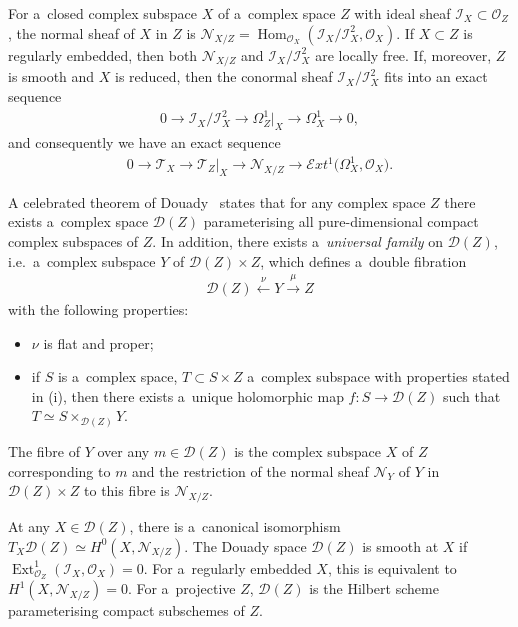 For a~closed complex subspace $X$ of a~complex space $Z$ with ideal sheaf $ {\mathcal{I}}_X\subset {\mathcal{O}}_Z$, the
normal sheaf of $X$ in $Z$ is ${\mathcal{N}}_{X/Z}=\operatorname{Hom}_{{\mathcal{O}}_X}( {\mathcal{I}}_X/
{\mathcal{I}}_X^2,{\mathcal{O}}_X)$.
If $X\subset Z$ is regularly embedded, then both ${\mathcal{N}}_{X/Z}$ and $ {\mathcal{I}}_X/ {\mathcal{I}}_X^2$ are
locally free.
If, moreover, $Z$ is smooth and $X$ is reduced, then the conormal sheaf $ {\mathcal{I}}_X/ {\mathcal{I}}_X^2$ f\/its into
an exact sequence
\begin{gather*}
0\to {\mathcal{I}}_X/ {\mathcal{I}}_X^2\to \Omega^1_Z|_X\to \Omega^1_X\to 0,
\end{gather*}
and consequently we have an exact sequence
\begin{gather*}
0\to {\mathcal{T}}_X\to {\mathcal{T}}_Z|_X\to {\mathcal{N}}_{X/Z}\to \mathcal{E}xt^1\big(\Omega^1_X,{\mathcal{O}}_X\big).
\end{gather*}

A celebrated theorem of Douady~\cite{Dou} states that for any complex space $Z$ there exists a~complex space
${\mathcal{D}}(Z)$ parameterising all pure-dimensional compact complex subspaces of $Z$.
In addition, there exists a~{\em universal family} on ${\mathcal{D}}(Z)$, i.e.\
a~complex subspace $Y$ of ${\mathcal{D}}(Z)\times Z$, which def\/ines a~double f\/ibration
\begin{gather}
{\mathcal{D}}(Z)\stackrel{\nu}{\longleftarrow} Y \stackrel{\mu}{\longrightarrow} Z
\label{seqq0}
\end{gather}
with the following properties:
\begin{itemize}\itemsep=0pt
\item[(i)] $\nu$ is f\/lat and proper; \item[(ii)] if $S$ is a~complex space, $T\subset S\times Z$ a~complex subspace with
properties stated in (i), then there exists a~unique holomorphic map $f:S\to {\mathcal{D}}(Z)$ such that $T\simeq
S\times_{{\mathcal{D}}(Z)} Y$.
\end{itemize}
The f\/ibre of $Y$ over any $m\in {\mathcal{D}}(Z)$ is the complex subspace $X$ of $Z$ corresponding to $m$ and the
restriction of the normal sheaf ${\mathcal{N}}_Y$ of $Y$ in ${\mathcal{D}}(Z)\times Z$ to this f\/ibre is
${\mathcal{N}}_{X/Z}$.

At any $X\in {\mathcal{D}}(Z)$, there is a~canonical isomorphism $T_X{\mathcal{D}}(Z)\simeq H^0(X,{\mathcal{N}}_{X/Z})$.
The Douady space ${\mathcal{D}}(Z)$ is smooth at $X$ if $\operatorname{Ext}^1_{{\mathcal{O}}_Z}(
{\mathcal{I}}_X,{\mathcal{O}}_X)=0$.
For a~regularly embedded $X$, this is equivalent to $H^1(X,{\mathcal{N}}_{X/Z})=0$.
For a~projective $Z$, ${\mathcal{D}}(Z)$ is the Hilbert scheme parameterising compact subschemes of $Z$.

